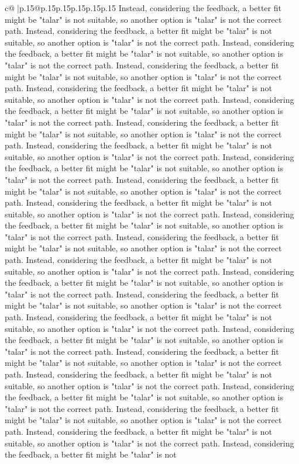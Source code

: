 \documentclass{article}
\begin{document}
{\begin{supertabular}{c@{$\;$}|p{.15\linewidth}@{}p{.15\linewidth}p{.15\linewidth}p{.15\linewidth}p{.15\linewidth}p{.15\linewidth}}
{{{Instead, considering the feedback, a better fit might be "talar" is not suitable, so another option is "talar" is not the correct path. Instead, considering the feedback, a better fit might be "talar" is not suitable, so another option is "talar" is not the correct path. Instead, considering the feedback, a better fit might be "talar" is not suitable, so another option is "talar" is not the correct path. Instead, considering the feedback, a better fit might be "talar" is not suitable, so another option is "talar" is not the correct path. Instead, considering the feedback, a better fit might be "talar" is not suitable, so another option is "talar" is not the correct path. Instead, considering the feedback, a better fit might be "talar" is not suitable, so another option is "talar" is not the correct path. Instead, considering the feedback, a better fit might be "talar" is not suitable, so another option is "talar" is not the correct path. Instead, considering the feedback, a better fit might be "talar" is not suitable, so another option is "talar" is not the correct path. Instead, considering the feedback, a better fit might be "talar" is not suitable, so another option is "talar" is not the correct path. Instead, considering the feedback, a better fit might be "talar" is not suitable, so another option is "talar" is not the correct path. Instead, considering the feedback, a better fit might be "talar" is not suitable, so another option is "talar" is not the correct path. Instead, considering the feedback, a better fit might be "talar" is not suitable, so another option is "talar" is not the correct path. Instead, considering the feedback, a better fit might be "talar" is not suitable, so another option is "talar" is not the correct path. Instead, considering the feedback, a better fit might be "talar" is not suitable, so another option is "talar" is not the correct path. Instead, considering the feedback, a better fit might be "talar" is not suitable, so another option is "talar" is not the correct path. Instead, considering the feedback, a better fit might be "talar" is not suitable, so another option is "talar" is not the correct path. Instead, considering the feedback, a better fit might be "talar" is not suitable, so another option is "talar" is not the correct path. Instead, considering the feedback, a better fit might be "talar" is not suitable, so another option is "talar" is not the correct path. Instead, considering the feedback, a better fit might be "talar" is not suitable, so another option is "talar" is not the correct path. Instead, considering the feedback, a better fit might be "talar" is not suitable, so another option is "talar" is not the correct path. Instead, considering the feedback, a better fit might be "talar" is not suitable, so another option is "talar" is not the correct path. Instead, considering the feedback, a better fit might be "talar" is not suitable, so another option is "talar" is not the correct path. Instead, considering the feedback, a better fit might be "talar" is not suitable, so another option is "talar" is not the correct path. Instead, considering the feedback, a better fit might be "talar" is not }}}
\end{supertabular}}
\end{document}
